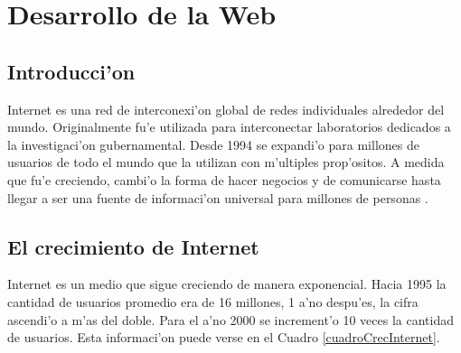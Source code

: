 \chapter{Desarrollo de la Web}
\label{desarrolloWeb}
\section{Introducci'on}

Internet es una red de interconexi'on global de redes individuales alrededor del mundo. Originalmente fu'e utilizada para interconectar laboratorios dedicados a la investigaci'on gubernamental. Desde 1994 se expandi'o para millones de usuarios de todo el mundo que la utilizan con m'ultiples prop'ositos. A medida que fu'e creciendo, cambi'o la forma de hacer negocios y de comunicarse hasta llegar a ser una fuente de informaci'on universal para millones de personas \citep{iws}.

\section{El crecimiento de Internet}

Internet es un medio que sigue creciendo de manera exponencial. Hacia 1995 la cantidad de usuarios promedio era de 16 millones, 1 a'no despu'es, la cifra ascendi'o a m'as del doble. Para el a'no 2000 se increment'o 10 veces la cantidad de usuarios. Esta informaci'on puede verse en el Cuadro \ref{cuadroCrecInternet}.

